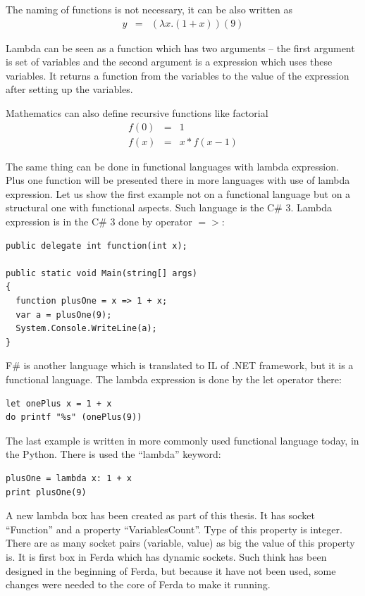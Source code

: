 \documentclass[a4paper,12pt]{book}
\begin{document}
The naming of functions is not necessary, it can be also written as 
\begin{eqnarray*}
y&=&(\lambda x.(1+x))(9)
\end{eqnarray*}

Lambda can be seen as a function which has two arguments -- the first argument is set of variables and the second argument is a expression which uses these variables. It returns a function from the variables to the value of the expression after setting up the variables.

Mathematics can also define recursive functions like factorial
\begin{eqnarray*}
f(0)&=&1\\
f(x)&=&x * f(x - 1)
\end{eqnarray*}

The same thing can be done in functional languages with lambda expression. Plus one function will be presented there in more languages with use of lambda expression. Let us show the first example not on a functional language but on a structural one with functional aspects. Such language is the C\# 3. Lambda expression is in the C\# 3 done by operator $=>$:

\begin{verbatim}
public delegate int function(int x);

public static void Main(string[] args)
{
  function plusOne = x => 1 + x;
  var a = plusOne(9);
  System.Console.WriteLine(a);
}
\end{verbatim}

F\# is another language which is translated to IL of .NET framework, but it is a functional language. The lambda expression is done by the let operator there:
\begin{verbatim}
let onePlus x = 1 + x
do printf "%s" (onePlus(9)) 
\end{verbatim}

The last example is written in more commonly used functional language today, in the Python. There is used the ``lambda'' keyword:
\begin{verbatim}
plusOne = lambda x: 1 + x
print plusOne(9)
\end{verbatim}

A new lambda box has been created as part of this thesis. It has socket ``Function'' and a property ``VariablesCount''. Type of this property is integer. There are as many socket pairs (variable, value) as big the value of this property is. It is first box in Ferda which has dynamic sockets. Such think has been designed in the beginning of Ferda, but because it have not been used, some changes were needed to the core of Ferda to make it running.
\end{document}
